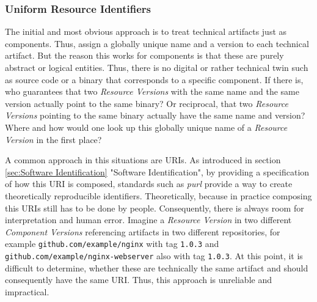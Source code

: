 \subsubsection{Uniform Resource Identifiers} 
The initial and most obvious approach is to treat technical artifacts just as components. Thus, assign a globally unique name and a version to each technical artifact. But the reason this works for components is that these are purely abstract or logical entities. Thus, there is no digital or rather technical twin such as source code or a binary that corresponds to a specific component. If there is, who guarantees that two \emph{Resource Versions} with the same name and the same version actually point to the same binary? Or reciprocal, that two \emph{Resource Versions} pointing to the same binary actually have the same name and version? Where and how would one look up this globally unique name of a \emph{Resource Version} in the first place?\par
A common approach in this situations are URIs. As introduced in section \ref{sec:Software Identification} "Software Identification", by providing a specification of how this URI is composed, standards such as \emph{purl} provide a way to create theoretically reproducible identifiers. Theoretically, because in practice composing this URIs still has to be done by people. Consequently, there is always room for interpretation and human error. Imagine a \emph{Resource Version} in two different \emph{Component Versions} referencing artifacts in two different repositories, for example \lstinline|github.com/example/nginx| with tag \lstinline|1.0.3| and \lstinline|github.com/example/nginx-webserver| also with tag \lstinline|1.0.3|. At this point, it is difficult to determine, whether these are technically the same artifact and should consequently have the same URI. Thus, this approach is unreliable and impractical.

